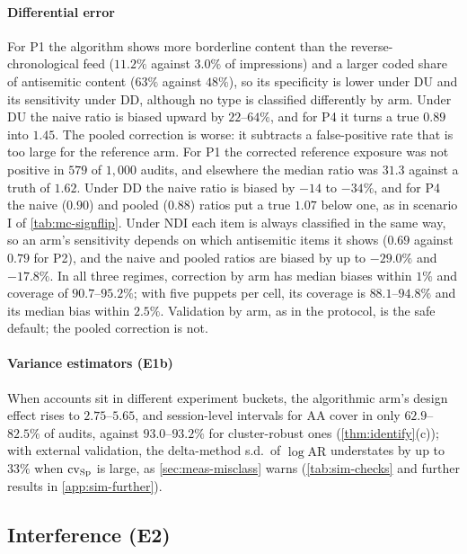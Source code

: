 \paragraph{Differential error} For P1 the algorithm shows more borderline content than the reverse-chronological feed ($11.2\%$ against $3.0\%$ of impressions) and a larger coded share of antisemitic content ($63\%$ against $48\%$), so its specificity is lower under DU and its sensitivity under DD, although no type is classified differently by arm. Under DU the naive ratio is biased upward by $22$--$64\%$, and for P4 it turns a true $0.89$ into $1.45$. The pooled correction is worse: it subtracts a false-positive rate that is too large for the reference arm. For P1 the corrected reference exposure was not positive in $579$ of $1{,}000$ audits, and elsewhere the median ratio was $31.3$ against a truth of $1.62$. Under DD the naive ratio is biased by $-14$ to $-34\%$, and for P4 the naive ($0.90$) and pooled ($0.88$) ratios put a true $1.07$ below one, as in scenario I of \cref{tab:mc-signflip}. Under NDI each item is always classified in the same way, so an arm's sensitivity depends on which antisemitic items it shows ($0.69$ against $0.79$ for P2), and the naive and pooled ratios are biased by up to $-29.0\%$ and $-17.8\%$. In all three regimes, correction by arm has median biases within $1\%$ and coverage of $90.7$--$95.2\%$; with five puppets per cell, its coverage is $88.1$--$94.8\%$ and its median bias within $2.5\%$. Validation by arm, as in the protocol, is the safe default; the pooled correction is not.

\paragraph{Variance estimators (E1b)} When accounts sit in different experiment buckets, the algorithmic arm's design effect rises to $2.75$--$5.65$, and session-level intervals for $\mathrm{AA}$ cover in only $62.9$--$82.5\%$ of audits, against $93.0$--$93.2\%$ for cluster-robust ones (\cref{thm:identify}(c)); with external validation, the delta-method s.d.\ of $\log\widehat{\mathrm{AR}}$ understates by up to $33\%$ when $\mathrm{cv}_{\mathrm{Sp}}$ is large, as \cref{sec:meas-misclass} warns (\cref{tab:sim-checks} and further results in \cref{app:sim-further}).

\subsection{Interference (E2)}\label{sec:sim-interference}

